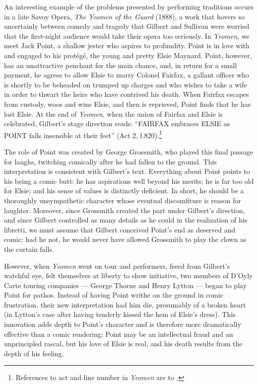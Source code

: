 \begin{paper}
An interesting example of the problems presented by performing
traditions occurs in a late Savoy Opera, \emph{The Yeomen of the Guard}
(1888), a work that hovers so uncertainly between comedy and tragedy
that Gilbert and Sullivan were worried that the first-night audience
would take their opera too seriously. In \emph{Yeomen}, we meet Jack
Point, a shallow jester who aspires to profundity. Point is in love with
and engaged to his protégé, the young and pretty Elsie Maynard. Point,
however, has an unattractive penchant for the main chance, and, in
return for a small payment, he agrees to allow Elsie to marry Colonel
Fairfax, a gallant officer who is shortly to be beheaded on trumped up
charges and who wishes to take a wife in order to thwart the heirs who
have contrived his death. When Fairfax escapes from custody, woos and
wins Elsie, and then is reprieved, Point finds that he has lost Elsie. At the end of \emph{Yeomen}, when the union of Fairfax and Elsie is
celebrated, Gilbert's stage direction reads: ``FAIRFAX embraces ELSIE as
POINT falls insensible at their feet'' (Act 2, l.820).\footnote{References
  to act and line number in \emph{Yeomen} are to \citealt{bradley_ian_complete_1996}.}

The role of Point was created by George Grossmith, who played this final
passage for laughs, twitching comically after he had fallen to the
ground. This interpretation is consistent with Gilbert's text.
Everything about Point points to his being a comic butt: he has
aspirations well beyond his merits; he is far too old for Elsie; and his
sense of values is distinctly deficient. In short, he should be a
thoroughly unsympathetic character whose eventual discomfiture is reason
for laughter. Moreover, since Grossmith created the part under Gilbert's
direction, and since Gilbert controlled as many details as he could in
the realization of his libretti, we must assume that Gilbert conceived
Point's end as deserved and comic; had he not, he would never have
allowed Grossmith to play the clown as the curtain falls.

However, when \emph{Yeomen} went on tour and performers, freed from
Gilbert's watchful eye, felt themselves at liberty to show initiative,
two members of D'Oyly Carte touring companies --- George Thorne and Henry
Lytton --- began to play Point for pathos. Instead of having Point writhe
on the ground in comic frustration, their new interpretation had him
die, presumably of a broken heart (in Lytton's case after having
tenderly kissed the hem of Elsie's dress). This innovation adds depth to
Point's character and is therefore more dramatically effective than a
comic rendering: Point may be an intellectual fraud and an unprincipled
rascal, but his love of Elsie is real, and his death results from the
depth of his feeling.


\end{paper}
